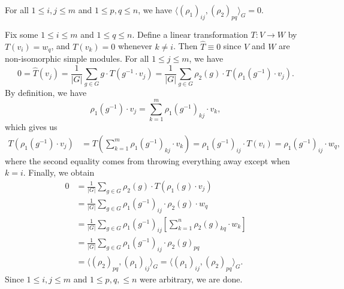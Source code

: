 \begin{thm}
    For all $1 \leq i, j \leq m$ and $1 \leq p, q \leq n$, we have 
    $\langle (\rho_1)_{ij}, (\rho_2)_{pq} \rangle_G = 0$. 
\end{thm}
\begin{pf}
    Fix some $1 \leq i \leq m$ and $1 \leq q \leq n$. Define a linear 
    transformation $T : V \to W$ by $T(v_i) = w_q$, and $T(v_k) = 0$
    whenever $k \neq i$. Then $\hat T \equiv 0$ since $V$ and $W$ 
    are non-isomorphic simple modules. For all $1 \leq j \leq m$, we have 
    \[ 0 = \hat T(v_j) = \frac1{|G|} \sum_{g \in G} g \cdot T(g^{-1} \cdot v_j) 
    = \frac1{|G|} \sum_{g\in G} \rho_2(g) \cdot T(\rho_1(g^{-1}) \cdot v_j). \]
    By definition, we have 
    \[ \rho_1(g^{-1}) \cdot v_j = \sum_{k=1}^m \rho_1(g^{-1})_{kj} \cdot v_k, \] 
    which gives us 
    \begin{align*}
        T(\rho_1(g^{-1}) \cdot v_j) 
        &= T \left( \sum_{k=1}^m \rho_1(g^{-1})_{kj} \cdot v_k \right) 
        = \rho_1(g^{-1})_{ij} \cdot T(v_i) 
        = \rho_1(g^{-1})_{ij} \cdot w_q, 
    \end{align*}
    where the second equality comes from throwing everything away except when 
    $k = i$. Finally, we obtain 
    \begin{align*}
        0 &= \frac1{|G|} \sum_{g\in G} \rho_2(g) \cdot T(\rho_1(g) \cdot v_j) \\ 
        &= \frac1{|G|} \sum_{g\in G} \rho_1(g^{-1})_{ij} \cdot \rho_2(g) \cdot w_q \\
        &= \frac1{|G|} \sum_{g\in G} \rho_1(g^{-1})_{ij} 
           \left[ \sum_{k=1}^n \rho_2(g)_{kq} \cdot w_k \right] \\
        &= \frac1{|G|} \sum_{g\in G} \rho_1(g^{-1})_{ij} \cdot \rho_2(g)_{pq} \\ 
        &= \langle (\rho_2)_{pq}, (\rho_1)_{ij} \rangle_G 
        = \langle (\rho_1)_{ij}, (\rho_2)_{pq} \rangle_G.
    \end{align*}
    Since $1 \leq i, j \leq m$ and $1 \leq p, q, \leq n$ were arbitrary, we 
    are done. 
\end{pf}

